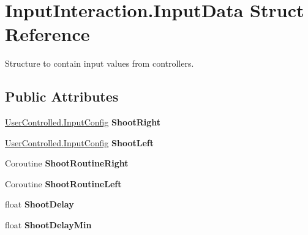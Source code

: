 \hypertarget{struct_input_interaction_1_1_input_data}{\section{Input\-Interaction.\-Input\-Data Struct Reference}
\label{struct_input_interaction_1_1_input_data}
}


Structure to contain input values from controllers.  


\subsection*{Public Attributes}
\begin{DoxyCompactItemize}
\item 
\hypertarget{struct_input_interaction_1_1_input_data_ace39281e98af9e9a092ceeb954f2b5f2}{\hyperlink{class_skyrates_1_1_common_1_1_a_i_1_1_user_controlled_1_1_input_config}{User\-Controlled.\-Input\-Config} {\bfseries Shoot\-Right}}\label{struct_input_interaction_1_1_input_data_ace39281e98af9e9a092ceeb954f2b5f2}

\item 
\hypertarget{struct_input_interaction_1_1_input_data_a74749b017236914c9977b5c2e79f32c9}{\hyperlink{class_skyrates_1_1_common_1_1_a_i_1_1_user_controlled_1_1_input_config}{User\-Controlled.\-Input\-Config} {\bfseries Shoot\-Left}}\label{struct_input_interaction_1_1_input_data_a74749b017236914c9977b5c2e79f32c9}

\item 
\hypertarget{struct_input_interaction_1_1_input_data_a5dfef24411513b2d6976057f032b8b18}{Coroutine {\bfseries Shoot\-Routine\-Right}}\label{struct_input_interaction_1_1_input_data_a5dfef24411513b2d6976057f032b8b18}

\item 
\hypertarget{struct_input_interaction_1_1_input_data_aede13fb518adc1a6840f096253f9e15b}{Coroutine {\bfseries Shoot\-Routine\-Left}}\label{struct_input_interaction_1_1_input_data_aede13fb518adc1a6840f096253f9e15b}

\item 
\hypertarget{struct_input_interaction_1_1_input_data_a5fe52ef299f6a43d7589c13207b91ac9}{float {\bfseries Shoot\-Delay}}\label{struct_input_interaction_1_1_input_data_a5fe52ef299f6a43d7589c13207b91ac9}

\item 
\hypertarget{struct_input_interaction_1_1_input_data_a42dfc16b290dc2d44fad6c6472bd3ea5}{float {\bfseries Shoot\-Delay\-Min}}\label{struct_input_interaction_1_1_input_data_a42dfc16b290dc2d44fad6c6472bd3ea5}

\end{DoxyCompactItemize}



